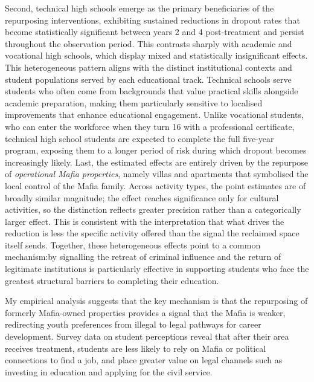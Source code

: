 \documentclass[12pt]{article}
\theoremstyle{plain}
\theoremstyle{plain}
\theoremstyle{plain}
\theoremstyle{definition}
\theoremstyle{plain}
\theoremstyle{definition}
\theoremstyle{plain}
\theoremstyle{remark}
\theoremstyle{definition}
\theoremstyle{definition}
\theoremstyle{plain}
\begin{document}
Second, technical high schools emerge as the primary beneficiaries of the repurposing interventions, exhibiting sustained reductions in dropout rates that become statistically significant between years 2 and 4 post-treatment and persist throughout the observation period. This contrasts sharply with academic and vocational high schools, which display mixed and statistically insignificant effects. This heterogeneous pattern aligns with the distinct institutional contexts and student populations served by each educational track. Technical schools serve students who often come from backgrounds that value practical skills alongside academic preparation, making them particularly sensitive to localised improvements that enhance educational engagement. Unlike vocational students, who can enter the workforce when they turn 16 with a professional certificate, technical high school students are expected to complete the full five-year program, exposing them to a longer period of risk during which dropout becomes increasingly likely. Last, the estimated effects are entirely driven by the repurpose of \emph{operational Mafia properties}, namely villas and apartments that symbolised the local control of the Mafia family. Across activity types, the point estimates are of broadly similar magnitude; the effect reaches significance only for cultural activities, so the distinction reflects greater precision rather than a categorically larger effect. This is consistent with the interpretation that what drives the reduction is less the specific activity offered than the signal the reclaimed space itself sends. 
Together, these heterogeneous effects point to a common mechanism:by signalling the retreat of criminal influence and the return of legitimate institutions is particularly effective in supporting students who face the greatest structural barriers to completing their education. \par
\medskip
My empirical analysis suggests that the key mechanism is that the repurposing of formerly Mafia-owned properties provides a signal that the Mafia is weaker, redirecting youth preferences from illegal to legal pathways for career development. Survey data on student perceptions reveal that after their area receives treatment, students are less likely to rely on Mafia or political connections to find a job, and place greater value on legal channels such as investing in education and applying for the civil service.
\end{document}
